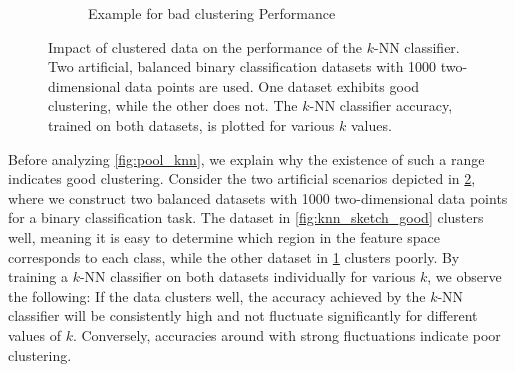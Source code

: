 \begin{figure}[htb]
\begin{subfigure}[b]{.475\textwidth}
		\caption{Example for bad clustering Performance}
		\label{fig:knn_sketch_bad}
	\end{subfigure}
	\caption{Impact of clustered data on the performance of the \textsf{$k$-NN} classifier. Two artificial, balanced binary classification datasets with 1000 two-dimensional data points are used. One dataset exhibits good clustering, while the other does not. The \textsf{$k$-NN} classifier accuracy, trained on both datasets, is plotted for various $k$ values.}
	\label{fig:knn_sketch}
\end{figure}

Before analyzing \cref{fig:pool_knn}, we explain why the existence of such a range indicates good clustering. Consider the two artificial scenarios depicted in \cref{fig:knn_sketch}, where we construct two balanced datasets with 1000 two-dimensional data points for a binary classification task. The dataset in \cref{fig:knn_sketch_good} clusters well, meaning it is easy to determine which region in the feature space corresponds to each class, while the other dataset in \cref{fig:knn_sketch_bad} clusters poorly. By training a \textsf{$k$-NN} classifier on both datasets individually for various $k$, we observe the following: If the data clusters well, the accuracy achieved by the \textsf{$k$-NN} classifier will be consistently high and not fluctuate significantly for different values of $k$. Conversely, accuracies around  with strong fluctuations indicate poor clustering.

